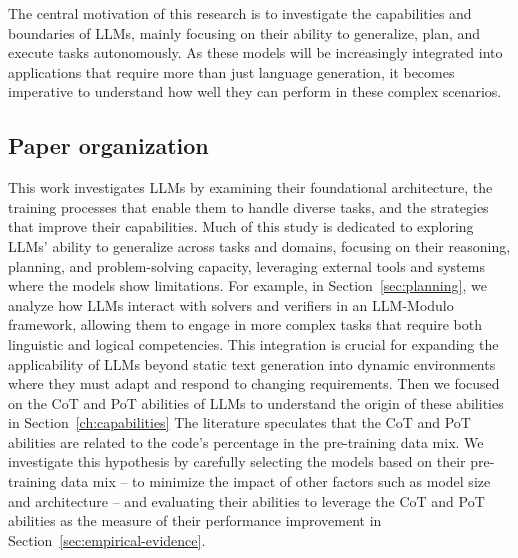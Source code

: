 The central motivation of this research is to investigate the capabilities and boundaries of LLMs, mainly focusing on their ability to generalize, plan, and execute tasks autonomously.
As these models will be increasingly integrated into applications that require more than just language generation, it becomes imperative to understand how well they can perform in these complex scenarios.



\subsection{Paper organization}

This work investigates LLMs by examining their foundational architecture, the training processes that enable them to handle diverse tasks, and the strategies that improve their capabilities.
Much of this study is dedicated to exploring LLMs' ability to generalize across tasks and domains, focusing on their reasoning, planning, and problem-solving capacity, leveraging external tools and systems where the models show limitations.
For example, in Section~\ref{sec:planning}, we analyze how LLMs interact with solvers and verifiers in an LLM-Modulo framework, allowing them to engage in more complex tasks that require both linguistic and logical competencies.
This integration is crucial for expanding the applicability of LLMs beyond static text generation into dynamic environments where they must adapt and respond to changing requirements.
Then we focused on the CoT and PoT abilities of LLMs to understand the origin of these abilities in Section~\ref{ch:capabilities}
The literature speculates that the CoT and PoT abilities are related to the code's percentage in the pre-training data mix.
We investigate this hypothesis by carefully selecting the models based on their pre-training data mix -- to minimize the impact of other factors such as model size and architecture -- and evaluating their abilities to leverage the CoT and PoT abilities as the measure of their performance improvement in Section~\ref{sec:empirical-evidence}.